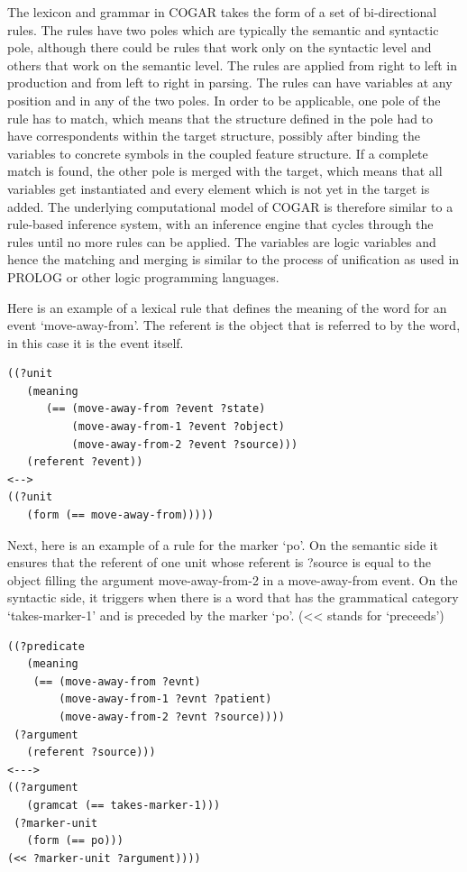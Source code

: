 The lexicon and grammar in COGAR takes the form of a set of bi-directional rules. The rules have two poles 
which are typically the semantic and syntactic pole, although there could be rules that work only on the 
syntactic level and others that work on the semantic level. The rules are applied 
from right to left in production and from left to right in parsing. 
The rules can have variables at any position and in any of the two poles. In order to be applicable, 
one pole of the rule has to match, which means that the structure defined in the pole had to 
have correspondents within the target structure, possibly after binding the variables to concrete 
symbols in the coupled feature structure. If a complete match is 
found, the other pole is merged with the target, which means that all variables get instantiated and every 
element which is not yet in the target is added. The underlying computational model of COGAR  
is therefore similar to a rule-based inference system, with an inference engine that cycles through the rules until 
no more rules can be applied. The variables are logic variables and hence the matching and merging is similar 
to the process of unification as used in PROLOG or other logic programming languages. 

Here is an example of a lexical rule that defines the meaning of the word for an event `move-away-from'. The referent is 
the object that is referred to by the word, in this case it is the event itself. 
\begin{verbatim}
((?unit 
   (meaning
      (== (move-away-from ?event ?state)
          (move-away-from-1 ?event ?object)
          (move-away-from-2 ?event ?source)))
   (referent ?event)) 
<-->
((?unit
   (form (== move-away-from)))))
\end{verbatim}
Next, here is an example of a rule for the marker `po'. On the semantic side it ensures that the referent of one unit 
whose referent is ?source is equal to the object filling the argument move-away-from-2 in a move-away-from event. 
On the syntactic side, it triggers when there is a word that has the grammatical category `takes-marker-1' and 
is preceded by the marker `po'. (<< stands for `preceeds') 
\begin{verbatim}
((?predicate 
   (meaning
    (== (move-away-from ?evnt)
        (move-away-from-1 ?evnt ?patient)
        (move-away-from-2 ?evnt ?source))))
 (?argument
   (referent ?source))) 
<---> 
((?argument
   (gramcat (== takes-marker-1)))
 (?marker-unit
   (form (== po))) 
(<< ?marker-unit ?argument))))
\end{verbatim}

